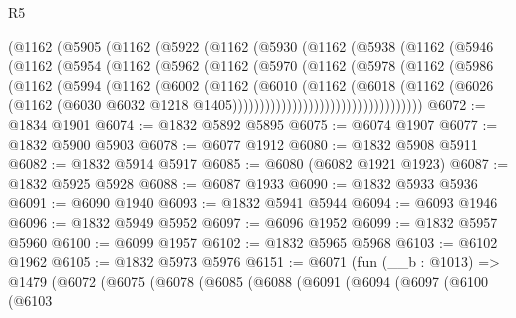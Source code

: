 \begin{lexlean}{R5}
\begin{coremodule}
          (@1162
            (@5905
              (@1162
                (@5922
                  (@1162
                    (@5930
                      (@1162
                        (@5938
                          (@1162
                            (@5946
                              (@1162
                                (@5954
                                  (@1162
                                    (@5962
                                      (@1162
                                        (@5970
                                          (@1162
                                            (@5978
                                              (@1162
                                                (@5986
                                                  (@1162
                                                    (@5994
                                                      (@1162
                                                        (@6002
                                                          (@1162
                                                            (@6010
                                                              (@1162
                                                                (@6018
                                                                  (@1162
                                                                    (@6026
                                                                      (@1162
                                                                        (@6030
                                                                          @6032
                                                                          @1218
                                                                          @1405)))))))))))))))))))))))))))))))))))
@6072 := @1834 @1901
@6074 := @1832 @5892 @5895
@6075 := @6074 @1907
@6077 := @1832 @5900 @5903
@6078 := @6077 @1912
@6080 := @1832 @5908 @5911
@6082 := @1832 @5914 @5917
@6085 := @6080 (@6082 @1921 @1923)
@6087 := @1832 @5925 @5928
@6088 := @6087 @1933
@6090 := @1832 @5933 @5936
@6091 := @6090 @1940
@6093 := @1832 @5941 @5944
@6094 := @6093 @1946
@6096 := @1832 @5949 @5952
@6097 := @6096 @1952
@6099 := @1832 @5957 @5960
@6100 := @6099 @1957
@6102 := @1832 @5965 @5968
@6103 := @6102 @1962
@6105 := @1832 @5973 @5976
@6151 := @6071
    (fun (__b : @1013) =>
    @1479
      (@6072
        (@6075
          (@6078
            (@6085
              (@6088
                (@6091
                  (@6094
                    (@6097
                      (@6100
                        (@6103

\end{coremodule}
\end{lexlean}
